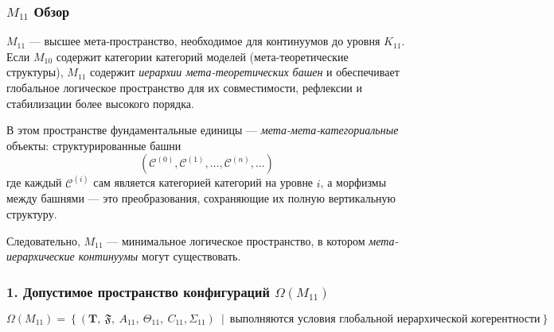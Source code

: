 

\subsubsection{$M_{11}$ Обзор}
\label{sec:m11-overview}

$M_{11}$ — высшее мета-пространство, необходимое для континуумов до уровня $K_{11}$.
Если $M_{10}$ содержит категории категорий моделей (мета-теоретические структуры),
$M_{11}$ содержит \emph{иерархии мета-теоретических башен} и обеспечивает
глобальное логическое пространство для их совместимости, рефлексии
и стабилизации более высокого порядка.

В этом пространстве фундаментальные единицы — \emph{мета-мета-категориальные} объекты:
структурированные башни
\[
(\mathcal{C}^{(0)}, \mathcal{C}^{(1)}, \ldots, \mathcal{C}^{(n)}, \ldots)
\]
где каждый $\mathcal{C}^{(i)}$ сам является категорией категорий на уровне $i$,
а морфизмы между башнями — это преобразования, сохраняющие их полную
вертикальную структуру.

Следовательно, $M_{11}$ — минимальное логическое пространство, в котором
\emph{мета-иерархические континуумы} могут существовать.

\subsubsection*{1. Допустимое пространство конфигураций \texorpdfstring{$\Omega(M_{11})$}{\Omega(M_{11})}}

\[
\Omega(M_{11}) =
\left\{
\left( \mathbf{T},\ \mathfrak{F},\ A_{11},\
\Theta_{11},\ C_{11},\Sigma_{11} \right)
\ \middle|\
\text{выполняются условия глобальной иерархической когерентности}
\right\}.
\]

